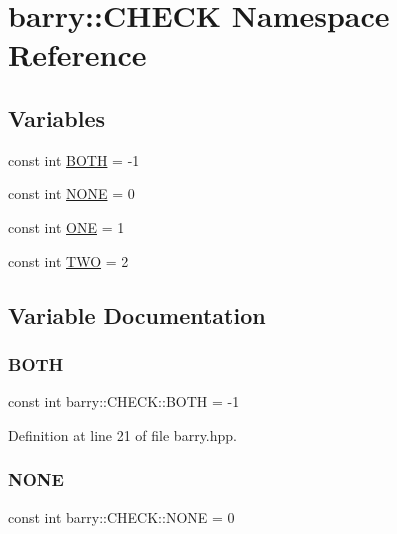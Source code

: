 \hypertarget{namespacebarry_1_1_c_h_e_c_k}{}\section{barry\+:\+:C\+H\+E\+CK Namespace Reference}
\label{namespacebarry_1_1_c_h_e_c_k}
\subsection*{Variables}
\begin{DoxyCompactItemize}
\item 
const int \hyperlink{namespacebarry_1_1_c_h_e_c_k_a604b0ef801ff768bd8561362cef579b2}{B\+O\+TH} = -\/1
\item 
const int \hyperlink{namespacebarry_1_1_c_h_e_c_k_aa64c84acf4e28b6cb1243ccda1eec41c}{N\+O\+NE} = 0
\item 
const int \hyperlink{namespacebarry_1_1_c_h_e_c_k_add50baad3a196b1979efbbf9e6c86913}{O\+NE} = 1
\item 
const int \hyperlink{namespacebarry_1_1_c_h_e_c_k_a6aa56c3d8a8260d90867278d21ace4d2}{T\+WO} = 2
\end{DoxyCompactItemize}


\subsection{Variable Documentation}
\mbox{\label{namespacebarry_1_1_c_h_e_c_k_a604b0ef801ff768bd8561362cef579b2}} 
\subsubsection{\texorpdfstring{B\+O\+TH}{BOTH}}
{\footnotesize\ttfamily const int barry\+::\+C\+H\+E\+C\+K\+::\+B\+O\+TH = -\/1}



Definition at line 21 of file barry.\+hpp.

\mbox{\label{namespacebarry_1_1_c_h_e_c_k_aa64c84acf4e28b6cb1243ccda1eec41c}} 
\subsubsection{\texorpdfstring{N\+O\+NE}{NONE}}
{\footnotesize\ttfamily const int barry\+::\+C\+H\+E\+C\+K\+::\+N\+O\+NE = 0}



